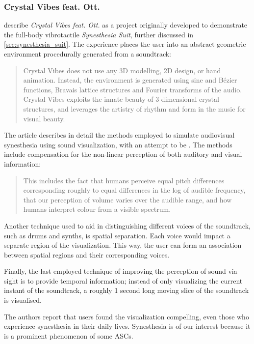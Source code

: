 \subsubsection{Crystal Vibes feat. Ott.}
\textcite{outram2017crystal} describe \textit{Crystal Vibes feat. Ott.} as a project originally developed to demonstrate the full-body vibrotactile \textit{Synesthesia Suit}, further discussed in \ref{sec:synesthesia_suit}. The experience places the user into an abstract geometric environment procedurally generated from a soundtrack:

\begin{quote}
    Crystal Vibes does not use any 3D modelling, 2D design, or hand animation. Instead, the environment is generated using sine and Bézier functions, Bravais lattice structures and Fourier transforms of the audio. Crystal Vibes exploits the innate beauty of 3-dimensional crystal structures, and leverages the artistry of rhythm and form in the music for visual beauty.
\end{quote}

The article describes in detail the methods employed to simulate audiovisual synesthesia using sound visualization, with an attempt to be . The methods include compensation for the non-linear perception of both auditory and visual information:

\begin{quote}
    This includes the fact that humans perceive equal pitch differences corresponding roughly to equal differences in the log of audible frequency, that our perception of volume varies over the audible range, and how humans interpret colour from a visible spectrum.
\end{quote}

Another technique used to aid in distinguishing different voices of the soundtrack, such as drums and synths, is spatial separation. Each voice would impact a separate region of the visualization. This way, the user can form an association between spatial regions and their corresponding voices.

Finally, the last employed technique of improving the perception of sound via sight is to provide temporal information; instead of only visualizing the current instant of the soundtrack, a roughly 1 second long moving slice of the soundtrack is visualised.

The authors report that users found the visualization compelling, even those who experience synesthesia in their daily lives. Synesthesia is of our interest because it is a prominent phenomenon of some \acp{ASC}.

